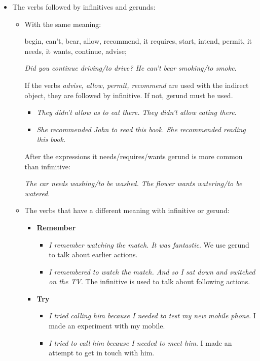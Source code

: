 \begin{itemize}
\item The verbs followed by infinitives and gerunds:

\begin{itemize}

\item With the same meaning: 

begin, can't, bear, allow, recommend, it requires, start, intend, permit, it needs, it wants, continue, advise;

\textit{Did you continue driving/to drive? He can't bear smoking/to smoke}. 

If the verbs \textit{advise, allow, permit, recommend} are used with the indirect object, they are followed by infinitive. If not, gerund must be used.

\begin{itemize}

\item \textit{They didn't allow us to eat there. They didn't allow eating there}.
\item \textit{She recommended John to read this book. She recommended reading this book}.
\end{itemize}

After the expressions it needs/requires/wants gerund is more common than infinitive:

\textit{The car needs washing/to be washed. The flower wants watering/to be watered}.

\item The verbs that have a different meaning with infinitive or gerund:

\begin{itemize}

\item \textbf{Remember}

\begin{itemize}
\item \textit{I remember watching the match. It was fantastic}. We use gerund to talk about earlier actions.
\item \textit{I remembered to watch the match. And so I sat down and switched on the TV}. The infinitive is used to talk about following actions.
\end{itemize}

\item \textbf{Try}

\begin{itemize}
\item \textit{I tried calling him because I needed to test my new mobile phone}. I made an experiment with my mobile.
\item \textit{I tried to call him because I needed to meet him}. I made an attempt to get in touch with him.
\end{itemize}


\end{itemize}
\end{itemize}
\end{itemize}
